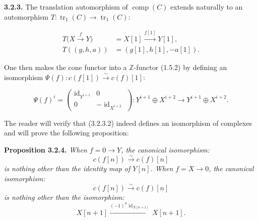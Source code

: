 \clearpage
{}%
\noindent\textbf{3.2.3.}\quad
{}
The translation automorphism of $\operatorname{comp}(C)$ extends naturally to
an automorphism
$T\colon\operatorname{tr}_1(C)\longrightarrow\operatorname{tr}_1(C)$:

\begin{equation}
  \begin{aligned}
    T\bigl(X\xrightarrow{f}Y\bigr)
      &=X[1]\xrightarrow{f[1]}Y[1],\\
    T((g,h,a))&=(g[1],h[1],-a[1]).
  \end{aligned}
  \tag{3.2.3.1}
\end{equation}

One then makes the cone functor into a $\mathbb Z$-functor (1.5.2) by defining
an isomorphism
$\Psi(f)\colon c(f[1])\xrightarrow{\sim}c(f)[1]$:

\begin{equation}
  \Psi(f)^i=
  \begin{pmatrix}
    \operatorname{id}_{Y^{i+1}} & 0\\
    0 & -\operatorname{id}_{X^{i+2}}
  \end{pmatrix}
  \colon Y^{i+1}\oplus X^{i+2}
  \longrightarrow Y^{i+1}\oplus X^{i+2}.
  \tag{3.2.3.2}
\end{equation}

The reader will verify that (3.2.3.2) indeed defines an isomorphism of
complexes and will prove the following proposition:

\noindent\textbf{Proposition 3.2.4.}\quad
{}
\emph{When $f=0\longrightarrow Y$, the canonical isomorphism:}
\begin{equation*}
  c(f[n])\xrightarrow{\sim}c(f)[n]
\end{equation*}
\emph{is nothing other than the identity map of $Y[n]$. When
$f=X\longrightarrow0$, the canonical isomorphism:}
\begin{equation*}
  c(f[n])\xrightarrow{\sim}c(f)[n]
\end{equation*}
\emph{is nothing other than the isomorphism:}
\begin{equation*}
  X[n+1]\xrightarrow{(-1)^n\operatorname{id}_{X[n+1]}}X[n+1].
\end{equation*}

